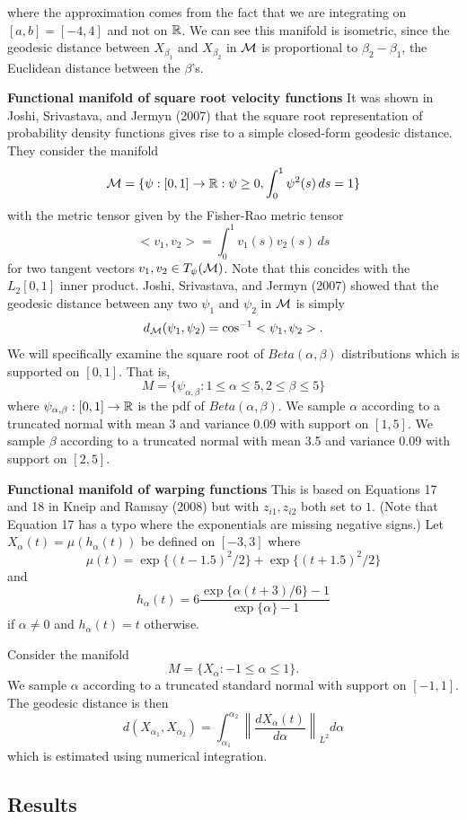 where the approximation comes from the fact that we are integrating on
\([a,b]=[-4,4]\) and not on \(\mathbb{R}\). We can see this manifold is
isometric, since the geodesic distance between \(X_{\beta_1}\) and
\(X_{\beta_2}\) in \(\mathcal{M}\) is proportional to \(\beta_2-\beta_1\), the
Euclidean distance between the \(\beta\)'s.

\textbf{Functional manifold of square root velocity functions} It was
shown in Joshi, Srivastava, and Jermyn (2007) that the square root
representation of probability density functions gives rise to a simple
closed-form geodesic distance. They consider the manifold
\[ \mathcal{M} = \{ \psi:[0,1] \to \mathbb{R} : \psi \ge 0, \int_0^1 \psi^2(s) \,ds = 1 \}\]
with the metric tensor given by the Fisher-Rao metric tensor
\[ <v_1,v_2> = \int_0^1 v_1(s) v_2(s) \,ds \] for two tangent vectors
\(v_1,v_2 \in T_\psi(\mathcal{M})\). Note that this concides with the
\(L_2[0,1]\) inner product. Joshi, Srivastava, and Jermyn (2007) showed
that the geodesic distance between any two \(\psi_1\) and \(\psi_2\) in
\(\mathcal{M}\) is simply \[d_{\mathcal{M}}(\psi_1,\psi_2) = \cos^{-1}<\psi_1,\psi_2>.\] We
will specifically examine the square root of \(Beta(\alpha,\beta)\)
distributions which is supported on \([0,1]\). That is,
\[ M = \{ \psi_{\alpha,\beta}: 1 \le \alpha \le 5, 2 \le \beta \le 5\} \]
where \(\psi_{\alpha,\beta}: [0,1] \to \mathbb{R}\) is the pdf of
\(Beta(\alpha,\beta)\). We sample \(\alpha\) according to a truncated
normal with mean 3 and variance 0.09 with support on \([1,5]\). We
sample \(\beta\) according to a truncated normal with mean 3.5 and
variance 0.09 with support on \([2,5]\).

\textbf{Functional manifold of warping functions} This is based on
Equations 17 and 18 in Kneip and Ramsay (2008) but with
\(z_{i1}, z_{i2}\) both set to \(1\). (Note that Equation 17 has a typo
where the exponentials are missing negative signs.) Let
\(X_\alpha(t) = \mu(h_\alpha(t))\) be defined on \([-3,3]\) where
\[ \mu(t) = \exp\{(t-1.5)^2/2\} + \exp\{(t+1.5)^2/2\}\] and
\[ h_\alpha(t) = 6 \frac{ \exp\{\alpha(t+3)/6\} - 1}{\exp\{\alpha\}-1}\]
if \(\alpha \ne 0\) and \(h_\alpha(t) = t\) otherwise.

Consider the manifold \[ M = \{X_\alpha: -1 \le \alpha \le 1\}.\] We
sample \(\alpha\) according to a truncated standard normal with support
on \([-1,1]\). The geodesic distance is then
\[ d(X_{\alpha_1},X_{\alpha_2}) = \int_{\alpha_1}^{\alpha_2} \left \| \frac{d X_\alpha (t)}{d\alpha} \right\|_{L^2} d\alpha\]
which is estimated using numerical integration.

\subsection{Results}\label{results}

